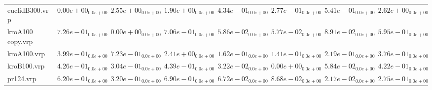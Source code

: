 \documentclass{article}
\begin{document}
\begin{table}
\begin{scriptsize}
\begin{tabular}{llllllll}
euclidB300.vrp & \cellcolor{gray95}$  0.00e+00_{ 0.0e+00}$ & $  2.55e+00_{ 0.0e+00}$ & $  1.90e+00_{ 0.0e+00}$ & $  4.34e-01_{ 0.0e+00}$ & \cellcolor{gray25}$  2.77e-01_{ 0.0e+00}$ & $  5.41e-01_{ 0.0e+00}$ & $  2.62e+00_{ 0.0e+00}$ \\
kroA100 copy.vrp & $  7.26e-01_{ 0.0e+00}$ & \cellcolor{gray95}$  0.00e+00_{ 0.0e+00}$ & $  7.06e-01_{ 0.0e+00}$ & $  5.86e-02_{ 0.0e+00}$ & \cellcolor{gray25}$  5.77e-02_{ 0.0e+00}$ & $  8.91e-02_{ 0.0e+00}$ & $  5.95e-01_{ 0.0e+00}$ \\
kroA100.vrp & $  3.99e-01_{ 0.0e+00}$ & $  7.23e-01_{ 0.0e+00}$ & $  2.41e+00_{ 0.0e+00}$ & \cellcolor{gray25}$  1.62e-01_{ 0.0e+00}$ & \cellcolor{gray95}$  1.41e-01_{ 0.0e+00}$ & $  2.19e-01_{ 0.0e+00}$ & $  3.76e-01_{ 0.0e+00}$ \\
kroB100.vrp & $  4.26e-01_{ 0.0e+00}$ & $  3.04e-01_{ 0.0e+00}$ & $  4.39e-01_{ 0.0e+00}$ & \cellcolor{gray25}$  3.22e-02_{ 0.0e+00}$ & \cellcolor{gray95}$  0.00e+00_{ 0.0e+00}$ & $  5.84e-02_{ 0.0e+00}$ & $  4.22e-01_{ 0.0e+00}$ \\
pr124.vrp & $  6.20e-01_{ 0.0e+00}$ & $  3.20e-01_{ 0.0e+00}$ & $  6.90e-01_{ 0.0e+00}$ & \cellcolor{gray25}$  6.72e-02_{ 0.0e+00}$ & $  8.68e-02_{ 0.0e+00}$ & \cellcolor{gray95}$  2.17e-02_{ 0.0e+00}$ & $  2.75e-01_{ 0.0e+00}$ \\
\hline
\end{tabular}
\end{scriptsize}
\end{table}
\end{document}
